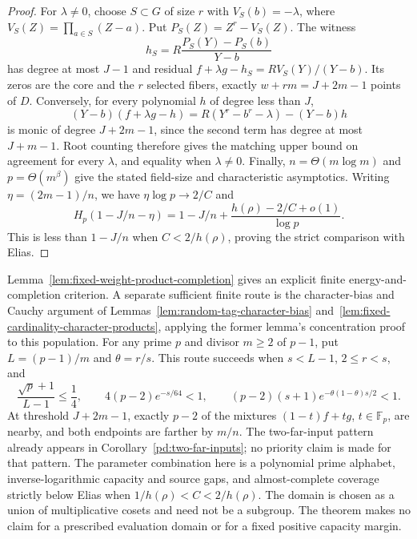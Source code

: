 \begin{proof}
For $\lambda\ne0$, choose $S\subset G$ of size $r$ with
$V_S(b)=-\lambda$, where $V_S(Z)=\prod_{a\in S}(Z-a)$.
Put $P_S(Z)=Z^r-V_S(Z)$.  The witness
\[
 h_S=R\frac{P_S(Y)-P_S(b)}{Y-b}
\]
has degree at most $J-1$ and residual
$f+\lambda g-h_S=R V_S(Y)/(Y-b)$.
Its zeros are the core and the $r$ selected fibers, exactly
$w+rm=J+2m-1$ points of $D$.
Conversely, for every polynomial $h$ of degree less than $J$,
\[
 (Y-b)(f+\lambda g-h)
 =R(Y^r-b^r-\lambda)-(Y-b)h
\]
is monic of degree $J+2m-1$, since the second term has degree at
most $J+m-1$.  Root counting therefore gives the matching upper
bound on agreement for every $\lambda$, and equality when
$\lambda\ne0$.
Finally, $n=\Theta(m\log m)$ and $p=\Theta(m^\beta)$ give the
stated field-size and characteristic asymptotics.
Writing $\eta=(2m-1)/n$, we have $\eta\log p\to2/C$ and
\[
 H_p(1-J/n-\eta)
 =1-J/n+\frac{h(\rho)-2/C+o(1)}{\log p}.
\]
This is less than $1-J/n$ when $C<2/h(\rho)$, proving the
strict comparison with Elias.
\end{proof}

Lemma~\ref{lem:fixed-weight-product-completion} gives an explicit
finite energy-and-completion criterion.  A separate sufficient finite
route is the character-bias and Cauchy argument of
Lemmas~\ref{lem:random-tag-character-bias}
and~\ref{lem:fixed-cardinality-character-products}, applying the
former lemma's concentration proof to this population.
For any prime $p$ and divisor $m\ge2$ of $p-1$, put
$L=(p-1)/m$ and $\theta=r/s$.  This route succeeds when
$s<L-1$, $2\le r<s$, and
\[
 \frac{\sqrt p+1}{L-1}\le\frac14,\qquad
 4(p-2)e^{-s/64}<1,\qquad
 (p-2)(s+1)e^{-\theta(1-\theta)s/2}<1.
\]
At threshold $J+2m-1$, exactly $p-2$ of the mixtures
$(1-t)f+tg$, $t\in\mathbb F_p$, are nearby, and both endpoints
are farther by $m/n$.
The two-far-input pattern already appears in
Corollary~\ref{pd:two-far-inputs}; no priority claim is made for that
pattern.  The parameter combination here is a polynomial prime alphabet,
inverse-logarithmic capacity and source gaps, and almost-complete
coverage strictly below Elias when $1/h(\rho)<C<2/h(\rho)$.
The domain is chosen as a union of multiplicative cosets and need not
be a subgroup.  The theorem makes no claim for a prescribed evaluation
domain or for a fixed positive capacity margin.



